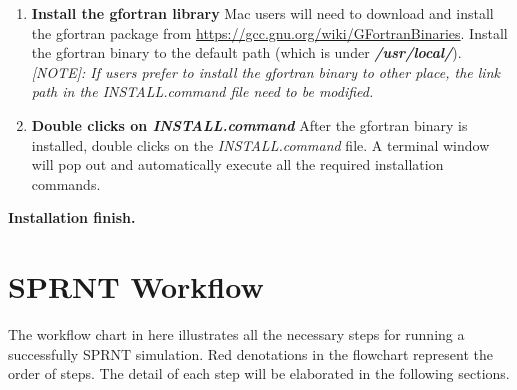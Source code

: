 \documentclass[12pt, letterpaper]{article}
\begin{document}
\begin{flushleft}
\begin{enumerate}
\item \textbf{Install the gfortran library}\newline
Mac users will need to download and install the gfortran package from \url{https://gcc.gnu.org/wiki/GFortranBinaries}. Install the gfortran binary to the default path (which is under \textbf{\emph{/usr/local/}}).\newline
\emph{[NOTE]: If users prefer to install the gfortran binary to other place, the link path in the \emph{INSTALL.command} file need to be modified.}
\item \textbf{Double clicks on \emph{INSTALL.command}}\newline
After the gfortran binary is installed, double clicks on the \emph{INSTALL.command} file. A terminal window will pop out and automatically execute all the required installation commands. 
\end{enumerate}
\centering
\textbf{Installation finish.}
\end{flushleft}





\newpage
\section{SPRNT Workflow}
The workflow chart in here illustrates all the necessary steps for running a successfully SPRNT simulation. Red denotations in the flowchart represent the order of steps. The detail of each step will be elaborated in the following sections.
\end{document}
